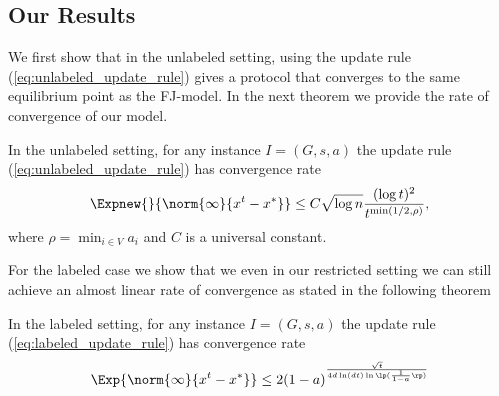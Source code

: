 \subsection{Our Results}
We first show that in the unlabeled setting, using the update rule
(\ref{eq:unlabeled_update_rule}) gives a protocol that converges to the
same equilibrium point as the FJ-model. In the next theorem we provide
the rate of convergence of our model.

\begin{theorem}\label{t:unlabeled_upper_bound}
  In the unlabeled setting, for any instance $I = (G, s, a)$ the
  update rule (\ref{eq:unlabeled_update_rule}) has convergence rate
  \[
    \Expnew{}{\norm{\infty}{x^t - x^*}} \leq
      C \sqrt{\log n}\frac{(\log t)^{2}}{t^{\min(1/2,\rho)}},
  \]
  where $\rho = \min_{i \in V} a_i$ and $C$ is a universal constant.
\end{theorem}

For the labeled case we show that we even in our restricted setting we can still
achieve an almost linear rate of convergence as stated in the following theorem

\begin{theorem}\label{t:labeled_upper_bound}
  In the labeled setting, for any instance $I = (G, s, a)$
  the update rule (\ref{eq:labeled_update_rule}) has convergence rate
  \[
    \Exp{\norm{\infty}{x^t -x^*}} \leq
    2(1-a)^{\frac{\sqrt{t}}{4d\ln(dt)\ln\lp( \frac{1}{1-a}\rp)}}
  \]
\end{theorem}



